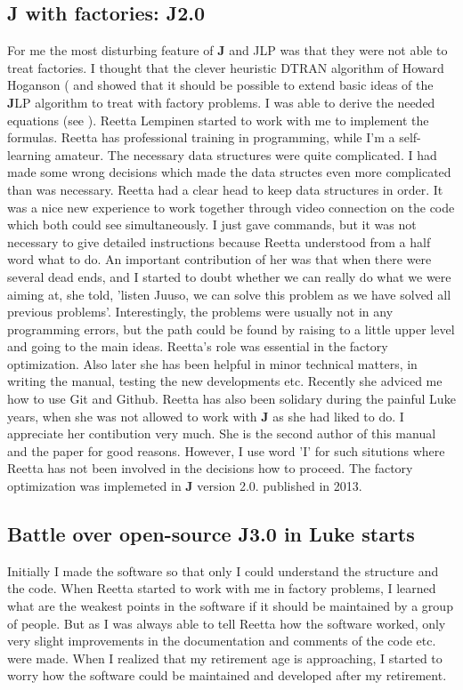 \subsection{\textbf{J} with factories: J2.0}
\label{preface3}
For me the most disturbing feature of \textbf{J} and JLP was that they were not able to treat factories.
I thought that the clever heuristic DTRAN algorithm of Howard Hoganson
(\cite{dtran} and \cite{howard} showed
that it should be possible to extend basic ideas of the
\textbf{J}LP algorithm to treat with factory
problems. I was able to derive the needed equations (see \cite{lappilem}).
Reetta Lempinen started to work with me to implement the formulas. Reetta has professional
training in programming, while I'm a self-learning amateur. The necessary
data structures were quite complicated.
I had made some wrong decisions which made the data structes even
more complicated than was necessary.
Reetta had a clear head to keep data structures in order.
It was a nice new experience to
work together through video connection on the code which both could
see simultaneously.
I just gave commands, but it was not necessary to give detailed
instructions because Reetta
understood from a half word what to do. An important
contribution of her was that when there were several dead ends,
and I started to doubt whether we can really
do what we were aiming at, she told, 'listen Juuso, we can solve this problem as we have
solved all previous problems'. Interestingly, the problems were usually not in any programming errors,
but the path could be found by raising to a little upper level and going to the main ideas.
Reetta's role was essential in the factory optimization. Also later she has been helpful in
minor technical matters, in writing the manual, testing the new developments etc. Recently she
adviced me how to use Git and Github. Reetta has also been
solidary during the painful Luke years, when she was not
allowed to work with \textbf{J} as she had liked
to do. I appreciate her contibution very much. She is the second author of this
manual and the paper \cite{lappilem} for good reasons. However, I use word 'I'
for such situtions where Reetta has not been involved in the decisions how to proceed. The factory optimization was implemeted in
\textbf{J} version 2.0. published in 2013.
\subsection{Battle over open-source J3.0 in Luke starts}
\label{preface4}

Initially I made the software so that only I could understand the structure and the code.
When Reetta started to work with me in factory problems,
I learned what are the weakest points in the software if it should be maintained
by a group of people. But as I was always able to tell Reetta how the software worked,
only very slight improvements in the documentation and comments of the code etc. were made.
When I realized that my retirement age is approaching,
I started to worry how the software could be maintained and developed after my retirement.

